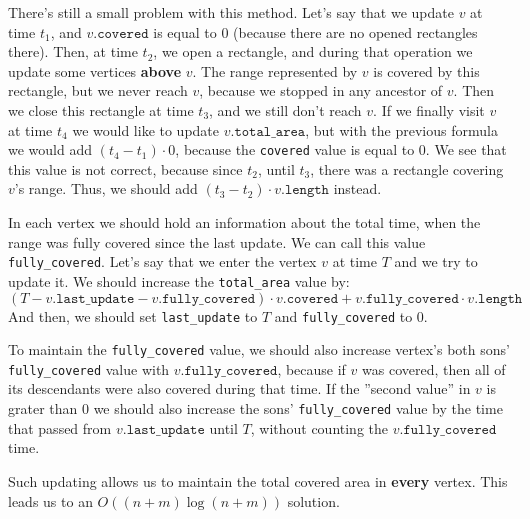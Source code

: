 There's still a small problem with this method.
Let's say that we update $v$ at time $t_1$, and $v.\texttt{covered}$ is equal to $0$
	(because there are no opened rectangles there).
Then, at time $t_2$, we open a rectangle, and during that operation
	we update some vertices \textbf{above} $v$.
The range represented by $v$ is covered by this rectangle, but we never reach $v$,
	because we stopped in any ancestor of $v$.
Then we close this rectangle at time $t_3$, and we still don't reach $v$.
If we finally visit $v$ at time $t_4$ we would like to update $v.\texttt{total\_area}$,
	but with the previous formula we would add $(t_4 - t_1) \cdot 0$,
	because the \texttt{covered} value is equal to $0$.
We see that this value is not correct, because since $t_2$, until $t_3$,
	there was a rectangle covering $v$'s range.
Thus, we should add $(t_3-t_2) \cdot v.\texttt{length}$ instead.

In each vertex we should hold an information about the total time,
	when the range was fully covered since the last update.
We can call this value \texttt{fully\_covered}.
Let's say that we enter the vertex $v$ at time $T$ and we try to update it.
We should increase the \texttt{total\_area} value by:
\[
	(T - v.\texttt{last\_update} - v.\texttt{fully\_covered}) \cdot v.\texttt{covered}
		+ v.\texttt{fully\_covered} \cdot v.\texttt{length}
\]
And then, we should set \texttt{last\_update} to $T$ and \texttt{fully\_covered} to $0$.

To maintain the \texttt{fully\_covered} value, we should also increase vertex's both sons' \texttt{fully\_covered} value
	with $v.\texttt{fully\_covered}$, because if $v$ was covered,
	then all of its descendants were also covered during that time.
If the ''second value'' in $v$ is grater than $0$ we should also increase the sons' \texttt{fully\_covered}
	value by the time that passed from $v.\texttt{last\_update}$ until $T$,
	without counting the $v.\texttt{fully\_covered}$ time.

Such updating allows us to maintain the total covered area in \textbf{every} vertex.
This leads us to an $O((n+m) \log (n+m))$ solution.
